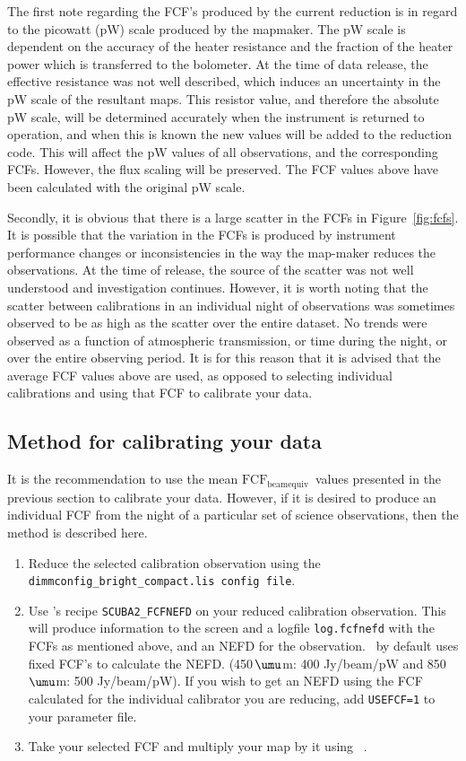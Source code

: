 \documentclass[twoside,11pt]{starlink}
\providecommand{\micron}{\mbox{\,${\umu}$m}}            %
\providecommand{\fcfbe}{$\mathrm{FCF_{beamequiv}}$}
\providecommand{\Kappa}{\xref{\textsc{Kappa}}{sun95}{}}
\providecommand{\picard}{\xref{\textsc{Picard}}{sun231}{}}
\providecommand{\drrecipe}[1]{\texttt{#1}}
\providecommand{\task}[1]{\textsf{#1}}
\providecommand{\cmult}{\xref{\task{cmult}}{sun95}{CMULT}}
\begin{document}
The first note regarding the FCF's produced by the current reduction
is in regard to the picowatt (pW) scale produced by the mapmaker. The
pW scale is dependent on the accuracy of the heater resistance and the
fraction of the heater power which is transferred to the bolometer. At
the time of data release, the effective resistance was not well
described, which induces an uncertainty in the pW scale of the
resultant maps. This resistor value, and therefore the absolute pW
scale, will be determined accurately when the instrument is returned
to operation, and when this is known the new values will be added to
the reduction code. This will affect the pW values of all
observations, and the corresponding FCFs. However, the flux scaling
will be preserved. The FCF values above have been calculated with the
original pW scale.

Secondly, it is obvious that there is a large scatter in the FCFs in
Figure~\ref{fig:fcfs}. It is possible that the variation in the FCFs
is produced by instrument performance changes or inconsistencies in
the way the map-maker reduces the observations. At the time of
release, the source of the scatter was not well understood and
investigation continues. However, it is worth noting that the scatter
between calibrations in an individual night of observations was
sometimes observed to be as high as the scatter over the entire
dataset. No trends were observed as a function of atmospheric
transmission, or time during the night, or over the entire observing
period. It is for this reason that it is advised that the average FCF
values above are used, as opposed to selecting individual calibrations
and using that FCF to calibrate your data.

\subsection{Method for calibrating your data}


It is the recommendation to use the mean \fcfbe\ values
presented in the previous section to calibrate your data. However, if
it is desired to produce an individual FCF from the night of a
particular set of science observations, then the method is described
here.

\begin{enumerate}
\item{Reduce the selected calibration observation using the
\texttt{dimmconfig\_bright\_compact.lis config file}.}
\item{Use \picard's recipe \drrecipe{SCUBA2\_FCFNEFD} on your reduced calibration
    observation. This will produce information to the screen and a
    logfile \texttt{log.fcfnefd} with the FCFs as mentioned above, and an NEFD
    for the observation. \picard\ by default uses fixed FCF's to
    calculate the NEFD. (450\micron: 400 Jy/beam/pW and 850\micron: 500
    Jy/beam/pW). If you wish to get an NEFD using the FCF calculated
    for the individual calibrator you are reducing, add \texttt{USEFCF=1} to
    your parameter file. }
\item{Take your selected FCF and multiply your map by it using \Kappa\
    \cmult.}
\end{enumerate}
\end{document}
